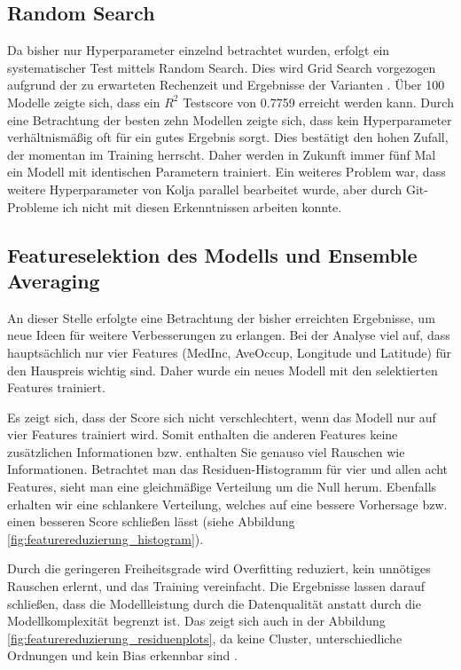 \documentclass[12pt,a4paper,ngerman,openany]{report}
\begin{document}
\subsection{Random Search}
Da bisher nur Hyperparameter einzelnd betrachtet wurden, erfolgt ein systematischer Test mittels Random Search. Dies wird Grid Search vorgezogen aufgrund der zu erwarteten Rechenzeit und Ergebnisse der Varianten \parencite{randomsearch2012}. Über 100 Modelle zeigte sich, dass ein $R^2$ Testscore von 0.7759 erreicht werden kann. Durch eine Betrachtung der besten zehn Modellen zeigte sich, dass kein Hyperparameter verhältnismäßig oft für ein gutes Ergebnis sorgt. Dies bestätigt den hohen Zufall, der momentan im Training herrscht. Daher werden in Zukunft immer fünf Mal ein Modell mit identischen Parametern trainiert.
Ein weiteres Problem war, dass weitere Hyperparameter von Kolja parallel bearbeitet wurde, aber durch Git-Probleme ich nicht mit diesen Erkenntnissen arbeiten konnte.

\subsection{Featureselektion des Modells und Ensemble Averaging}
An dieser Stelle erfolgte eine Betrachtung der bisher erreichten Ergebnisse, um neue Ideen für weitere Verbesserungen zu erlangen. Bei der Analyse viel auf, dass hauptsächlich nur vier Features (MedInc, AveOccup, Longitude und Latitude) für den Hauspreis wichtig sind. Daher wurde ein neues Modell mit den selektierten Features trainiert. 

Es zeigt sich, dass der Score sich nicht verschlechtert, wenn das Modell nur auf vier Features trainiert wird. Somit enthalten die anderen Features keine zusätzlichen Informationen bzw. enthalten Sie genauso viel Rauschen wie Informationen. Betrachtet man das Residuen-Histogramm für vier und allen acht Features, sieht man eine gleichmäßige Verteilung um die Null herum. Ebenfalls erhalten wir eine schlankere Verteilung, welches auf eine bessere Vorhersage bzw. einen besseren Score schließen lässt (siehe Abbildung \ref{fig:featurereduzierung_histogram}).

Durch die geringeren Freiheitsgrade wird Overfitting reduziert, kein unnötiges Rauschen erlernt, und das Training vereinfacht. Die Ergebnisse lassen darauf schließen, dass die Modellleistung durch die Datenqualität anstatt durch die Modellkomplexität begrenzt ist. Das zeigt sich auch in der Abbildung \ref{fig:featurereduzierung_residuenplots}, da keine Cluster, unterschiedliche Ordnungen und kein Bias erkennbar sind \parencite{residuenanalysis2022}.
\end{document}
